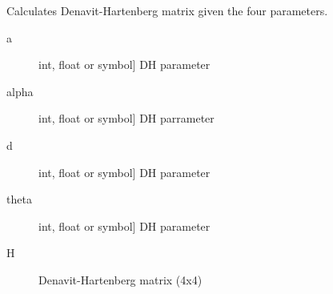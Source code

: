 \documentclass[letterpaper,10pt,english]{sphinxmanual}
\begin{document}
\begin{fulllineitems}
\label{\detokenize{_src/didactic:rkd.didactic.transformations.dh}}
Calculates Denavit-Hartenberg matrix given the four parameters.
\begin{description}
\item[{a}] \leavevmode{[}int, float or symbol{]}
DH parameter

\item[{alpha}] \leavevmode{[}int, float or symbol{]}
DH parrameter

\item[{d}] \leavevmode{[}int, float or symbol{]}
DH parameter

\item[{theta}] \leavevmode{[}int, float or symbol{]}
DH parameter

\end{description}
\begin{description}
\item[{H}] \leavevmode{[}\sphinxcode{\sphinxupquote{sympy.matrices.dense.MutableDenseMatrix}}{]}
Denavit-Hartenberg matrix (4x4)

\end{description}

%
\begin{sphinxVerbatim}[commandchars=\\\{\}]
\end{sphinxVerbatim}

\end{fulllineitems}

\end{document}
